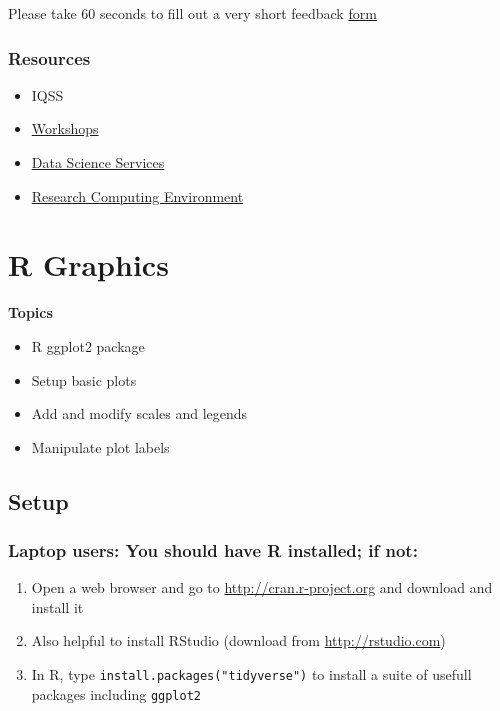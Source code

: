 \documentclass[]{book}
\providecommand{\tightlist}{%
  \setlength{\itemsep}{0pt}\setlength{\parskip}{0pt}}
\begin{document}
Please take 60 seconds to fill out a very short feedback
\href{http://bit.ly/training_class_eval}{form}

\subsection{Resources}\label{resources-1}

\begin{itemize}
\tightlist
\item
  IQSS
\item
  \href{https://dss.iq.harvard.edu/workshop-materials}{Workshops}
\item
  \href{https://dss.iq.harvard.edu/}{Data Science Services}
\item
  \href{https://iqss.github.io/dss-rce/}{Research Computing Environment}
\end{itemize}

\chapter{R Graphics}\label{r-graphics}

\textbf{Topics}

\begin{itemize}
\tightlist
\item
  R ggplot2 package
\item
  Setup basic plots
\item
  Add and modify scales and legends
\item
  Manipulate plot labels
\end{itemize}

\section{Setup}\label{setup-2}

\subsection{Laptop users: You should have R installed; if
not:}\label{laptop-users-you-should-have-r-installed-if-not}

\begin{enumerate}
\def\labelenumi{\arabic{enumi}.}
\item
  Open a web browser and go to \url{http://cran.r-project.org} and
  download and install it
\item
  Also helpful to install RStudio (download from
  \url{http://rstudio.com})
\item
  In R, type \texttt{install.packages("tidyverse")} to install a suite
  of usefull packages including \texttt{ggplot2}
\end{enumerate}
\end{document}
